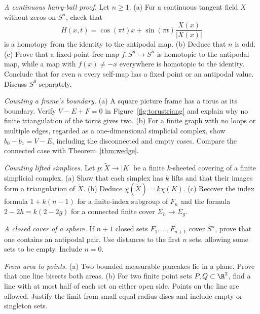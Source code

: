 \begin{exercise}[$\star\star$]\label{ex:hairydegree}
\emph{A continuous hairy-ball proof.} Let $n\ge1$. (a) For a continuous tangent field $X$ without zeros on $S^n$, check that
\[
H(x,t)=\cos(\pi t)x+\sin(\pi t)\frac{X(x)}{|X(x)|}
\]
is a homotopy from the identity to the antipodal map. (b) Deduce that $n$ is odd. (c) Prove that a fixed-point-free map $f:S^n\to S^n$ is homotopic to the antipodal map, while a map with $f(x)\ne-x$ everywhere is homotopic to the identity. Conclude that for even $n$ every self-map has a fixed point or an antipodal value. Discuss $S^0$ separately.
\end{exercise}

\begin{exercise}[$\star$]\label{ex:lhuilier}
\emph{Counting a frame's boundary.} (a) A square picture frame has a torus as its boundary. Verify $V-E+F=0$ in Figure~\ref{fig:torustriang} and explain why no finite triangulation of the torus gives two. (b) For a finite graph with no loops or multiple edges, regarded as a one-dimensional simplicial complex, show $b_0-b_1=V-E$, including the disconnected and empty cases. Compare the connected case with Theorem~\ref{thm:wedge}.
\end{exercise}

\begin{exercise}[$\star\star$]\label{ex:coveringchi}
\emph{Counting lifted simplices.} Let $p:\tilde X\to|K|$ be a finite $k$-sheeted covering of a finite simplicial complex. (a) Show that each simplex has $k$ lifts and that their images form a triangulation of $\tilde X$. (b) Deduce $\chi(\tilde X)=k\chi(K)$. (c) Recover the index formula $1+k(n-1)$ for a finite-index subgroup of $F_n$ and the formula $2-2h=k(2-2g)$ for a connected finite cover $\Sigma_h\to\Sigma_g$.
\end{exercise}

\begin{exercise}[$\star\star$]\label{ex:lusternik}
\emph{A closed cover of a sphere.} If $n+1$ closed sets $F_1,\ldots,F_{n+1}$ cover $S^n$, prove that one contains an antipodal pair. Use distances to the first $n$ sets, allowing some sets to be empty. Include $n=0$.
\end{exercise}

\begin{exercise}[$\star$]\label{ex:pancakes}
\emph{From area to points.} (a) Two bounded measurable pancakes lie in a plane. Prove that one line bisects both areas. (b) For two finite point sets $P,Q\subset\R^2$, find a line with at most half of each set on either open side. Points on the line are allowed. Justify the limit from small equal-radius discs and include empty or singleton sets.
\end{exercise}

